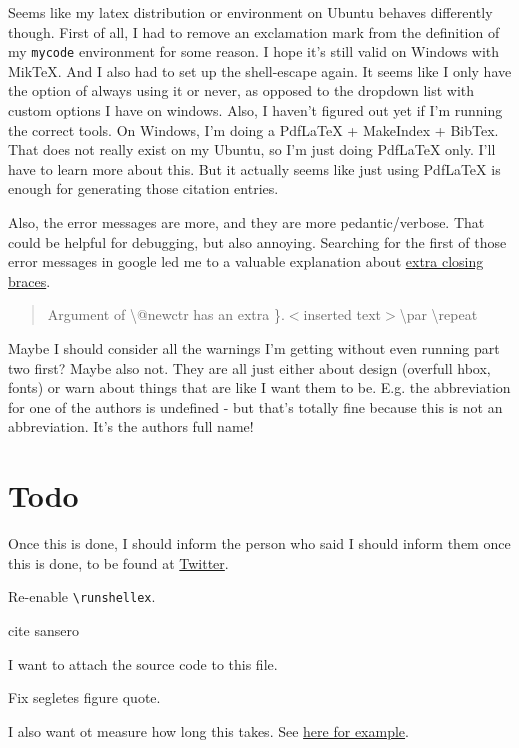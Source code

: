\documentclass{article} \usepackage[utf8]{inputenc}
\newcommand{\code}[1]{\colorbox{codebggray}{{\texttt{#1}}}}
\begin{document}
Seems like my latex distribution or environment on Ubuntu behaves differently though. First of all, I had to remove an exclamation mark from the definition of my \code{mycode} environment for some reason. I hope it's still valid on Windows with MikTeX.
And I also had to set up the shell-escape again. It seems like I only have the option of always using it or never, as opposed to the dropdown list with custom options I have on windows. Also, I haven't figured out yet if I'm running the correct tools. On Windows, I'm doing a PdfLaTeX + MakeIndex + BibTex. That does not really exist on my Ubuntu, so I'm just doing PdfLaTeX only. I'll have to learn more about this.
But it actually seems like just using PdfLaTeX is enough for generating those citation entries.

Also, the error messages are more, and they are more pedantic/verbose. That could be helpful for debugging, but also annoying.
Searching for the first of those error messages in google led me to a valuable explanation about \href{http://www.texfaq.org/FAQ-extrabrace}{extra closing braces}.

\begin{quote}
Argument of \textbackslash @newctr has an extra \}.$<$inserted text$>$\textbackslash par \textbackslash repeat
\end{quote}

Maybe I should consider all the warnings I'm getting without even running part two first? Maybe also not. They are all just either about design (overfull hbox, fonts) or warn about things that are like I want them to be. E.g. the abbreviation for one of the authors is undefined - but that's totally fine because this is not an abbreviation. It's the authors full name!

\section{Todo}
Once this is done, I should inform the person who said I should inform them once this is done, to be found at \href{https://twitter.com/LucidBrot/status/1290792953548615682}{Twitter}.

Re-enable \code{\textbackslash runshellex}.

cite sansero

I want to attach the source code to this file.

Fix segletes figure quote.

I also want ot measure how long this takes. See \href{https://tex.stackexchange.com/questions/505770/how-to-measure-the-compilation-time-of-a-document?rq=1}{here for example}.
\end{document}

